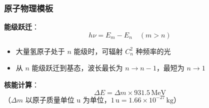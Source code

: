 \subsubsection{原子物理模板}

\textbf{能级跃迁}：
\[
h\nu = E_m - E_n \quad (m > n)
\]
\begin{itemize}
  \item 大量氢原子处于 $n$ 能级时，可辐射 $C_n^2$ 种频率的光
  \item 从 $n$ 能级跃迁到基态，波长最长为 $n\to n-1$，最短为 $n\to1$
\end{itemize}

\textbf{核能计算}：
\[
\Delta E = \Delta m \times 931.5\,\text{MeV}
\]
（$\Delta m$ 以原子质量单位 u 为单位，$1\,\text{u} = 1.66\times10^{-27}\,\text{kg}$）
